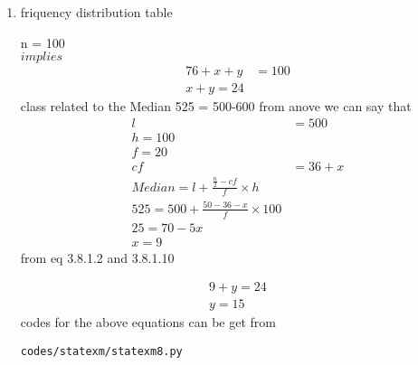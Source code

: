 \renewcommand{\theequation}{\theenumi}
\begin{enumerate}[label=\arabic*.,ref=\thesubsection.\theenumi]
\item \begin{table}[!ht]
	\centering
	
	\caption{friquency distribution table }
\end{table}

n = 100
\\
$implies$
\begin{align}
76 + x + y &= 100
\\
x+y = 24
\end{align}
class related to the Median 525 = 500-600
from anove we can say that 
\\
\begin{align}
l &= 500
\\
h = 100
\\
f= 20
\\
cf &= 36+x
\\
Median = l + \frac{\frac{n}{2} - cf}{f}\times h
\\
525 =  500 + \frac{50-36-x}{f}\times 100
\\
25 = 70-5x
\\
x = 9
\end{align}
from eq 3.8.1.2 and 3.8.1.10

\begin{align}
9 + y = 24
\\
y= 15
\end{align}
codes for the above equations can be get from
\begin{lstlisting}
codes/statexm/statexm8.py
\end{lstlisting}
\end{enumerate}